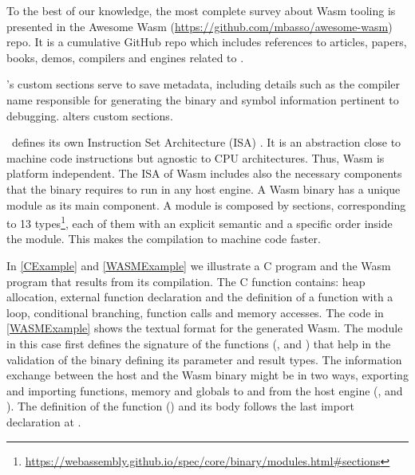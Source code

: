 
\msection{\Wasm}

To the best of our knowledge, the most complete survey about Wasm  tooling is presented in the Awesome Wasm  (\url{https://github.com/mbasso/awesome-wasm}) repo. It is a cumulative GitHub repo which includes references to articles, papers, books, demos, compilers and engines related to \wasm. 


\label{background:wasm:binary}






\Wasm's custom sections serve to save metadata, including details such as the compiler name responsible for generating the binary and symbol information pertinent to debugging. 
\tool alters custom sections. 


\wasm\ defines its own Instruction Set Architecture (ISA) \cite{wasm_spec}. It is an abstraction close to machine code instructions but agnostic to CPU architectures. Thus, Wasm  is platform independent. The ISA of Wasm  includes also the necessary components that the binary requires to run in any host engine. 
A Wasm  binary has a unique module as its main component. A module is composed by sections, corresponding to 13 types\footnote{\url{https://webassembly.github.io/spec/core/binary/modules.html\#sections}}, each of them with an explicit semantic and a specific order inside the module. This makes the compilation to machine code faster. %


In \autoref{CExample} and \autoref{WASMExample} we illustrate a C program and the Wasm program that results from its compilation. The C function contains: heap allocation, external function declaration and the definition of a function with a loop, conditional branching, function calls and memory accesses. The code in \autoref{WASMExample} shows the textual format for the generated Wasm. The module in this case first defines the signature of the functions (,   and  )  that help in the validation of the binary defining its parameter and result types. The information exchange between the host and the Wasm  binary might be in two ways, exporting and importing functions, memory and globals to and from the host engine (,  and ). The definition of the function () and its body follows the last import declaration at . 


